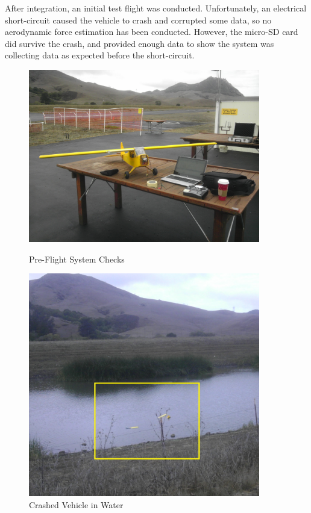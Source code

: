 After integration, an initial test flight was conducted. Unfortunately, an electrical short-circuit caused the vehicle to  crash and corrupted some data, so no aerodynamic force estimation has been conducted. However, the micro-SD card did survive the crash, and provided enough data to show the system was collecting data as expected before the short-circuit.
\begin{figure}[H]
\label{sysIntPics}
\begin{center}
\begin{minipage}[b]{0.4\linewidth}
\label{preFlightFig}
  \centering
    \includegraphics[width=0.9\textwidth]{figures/preFlight.jpg}
    \caption{Pre-Flight System Checks}
\end{minipage}
\begin{minipage}[b]{0.4\linewidth}
  \centering
    \includegraphics[width=0.9\textwidth]{figures/crash.jpg}
    \caption{Crashed Vehicle in Water}
\end{minipage}
\end{center}
\end{figure}
